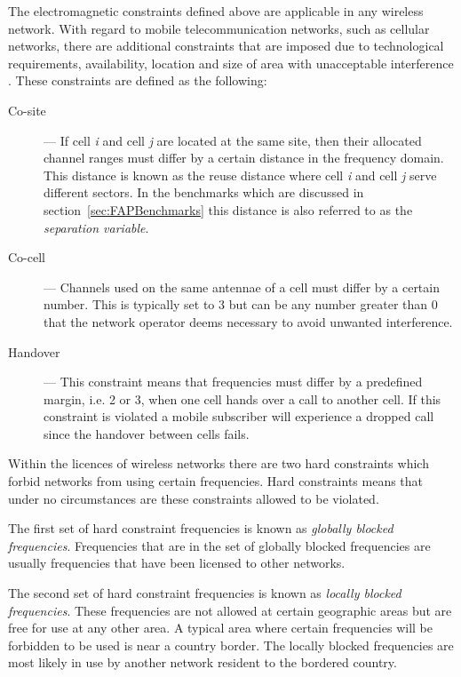 The electromagnetic constraints defined above are applicable in any wireless network. With regard to mobile telecommunication networks, such as cellular networks, there are additional constraints that are imposed due to technological requirements, availability, location and size of area with unacceptable interference \cite{Karen2004,Eisenblatter,AndreasPaper}. These constraints are defined as the following:
\begin{description}
\item[Co-site] --- If cell \emph{i} and cell \emph{j} are located at the same site, then their allocated channel ranges must differ by a certain distance in the frequency domain. This distance is known as the reuse distance where cell \emph{i} and cell \emph{j} serve different sectors\cite{FixedFAPPSO,EgyptFAPPSO}. In the benchmarks which are discussed in section~\ref{sec:FAPBenchmarks} this distance is also referred to as the \emph{separation variable}. 
\item[Co-cell] --- Channels used on the same antennae of a cell must differ by a certain number. This is typically set to 3 but can be any number greater than 0 that the network operator deems necessary to avoid unwanted interference\cite{Karen2004,Eisenblatter,AndreasPaper}.
\item[Handover] --- This constraint means that frequencies must differ by a predefined margin, i.e. 2 or 3, when one cell hands over a call to another cell. If this constraint is violated a mobile subscriber will experience a dropped call since the handover between cells fails\cite{Karen2004,Eisenblatter,AndreasPaper}.
\end{description}

Within the licences of wireless networks there are two hard constraints which forbid networks from using certain frequencies. Hard constraints means that under no circumstances are these constraints allowed to be violated.

The first set of hard constraint frequencies is known as \emph{globally blocked frequencies}. Frequencies that are in the set of globally blocked frequencies are usually frequencies that have been licensed to other networks\cite{Karen2004,InterferenceOrientatedFAP}.

The second set of hard constraint frequencies is known as \emph{locally blocked frequencies}. These frequencies are not allowed at certain geographic areas but are free for use at any other area\cite{InterferenceOrientatedFAP}. A typical area where certain frequencies will be forbidden to be used is near a country border\cite{InterferenceOrientatedFAP}. The locally blocked frequencies are most likely in use by another network resident to the bordered country.

